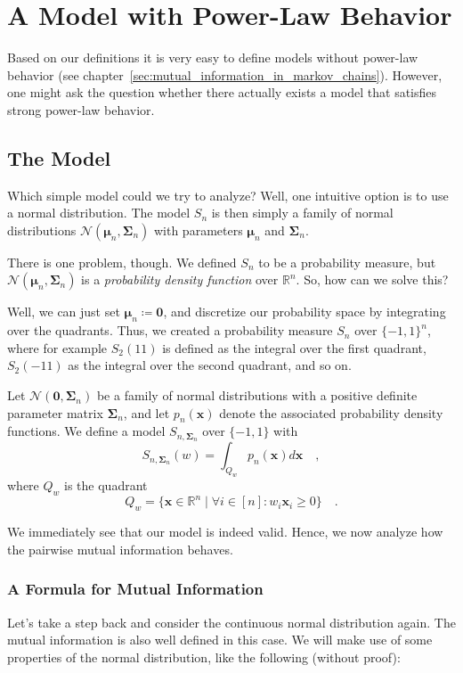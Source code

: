 \documentclass[../../main.tex]{subfiles}
\begin{document}
\section{A Model with Power-Law Behavior}
Based on our definitions it is very easy to define models without power-law behavior (see chapter~\ref{sec:mutual_information_in_markov_chains}). However, one might ask the question whether there actually exists a model that satisfies strong power-law behavior.

\subsection{The Model}
Which simple model could we try to analyze? Well, one intuitive option is to use a normal distribution. The model $S_n$ is then simply a family of normal distributions $\mathcal{N}(\bm{\mu}_n, \bm{\Sigma}_n)$ with parameters $\bm{\mu}_n$ and $\bm{\Sigma}_n$.

There is one problem, though. We defined $S_n$ to be a probability measure, but $\mathcal{N}(\bm{\mu}_n, \bm{\Sigma}_n)$ is a \emph{probability density function} over $\mathbb{R}^n$. So, how can we solve this?

Well, we can just set $\bm{\mu}_n \coloneqq \bm{0}$, and discretize our probability space by integrating over the quadrants. Thus, we created a probability measure $S_n$ over $\{-1, 1\}^n$, where for example $S_2(11)$ is defined as the integral over the first quadrant, $S_2(-11)$ as the integral over the second quadrant, and so on.

\begin{definition}
    \label{definition:the_model}
    Let $\mathcal{N}(\bm{0}, \bm{\Sigma}_n)$ be a family of normal distributions with a positive definite parameter matrix $\bm{\Sigma}_n$, and let $p_n(\bm{x})$ denote the associated probability density functions. We define a model $S_{n, \bm{\Sigma}_n}$ over $\{-1, 1\}$ with
    \[
        S_{n, \bm{\Sigma}_n}(w) = \int_{Q_w} p_n(\bm{x}) d\bm{x} \quad ,
    \]
    where $Q_w$ is the quadrant
    \[
        Q_w = \{ \bm{x} \in \mathbb{R}^n \mid \forall i \in [n] : w_i \bm{x}_i \geq 0 \} \quad .
    \]
\end{definition}

We immediately see that our model is indeed valid. Hence, we now analyze how the pairwise mutual information behaves.

\subsubsection{A Formula for Mutual Information}
Let's take a step back and consider the continuous normal distribution again. The mutual information is also well defined in this case. We will make use of some properties of the normal distribution, like the following (without proof):
\end{document}
